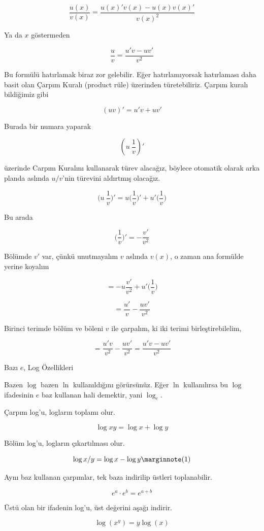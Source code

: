 \documentclass[12pt,fleqn]{article}\usepackage{../../common}
\begin{document}
$$ \frac{ u(x)}{v(x)} = \frac{u(x)'v(x) - u(x)v(x)'}{v(x)^2} $$

Ya da $x$ göstermeden

$$ \frac{ u}{v} = \frac{u'v - uv'}{v^2} $$

Bu formülü hatırlamak biraz zor gelebilir. Eğer hatırlamıyorsak hatırlaması
daha basit olan Çarpım Kuralı (product rüle) üzerinden
türetebiliriz. Çarpım kuralı bildiğimiz gibi

$$ (uv)' = u'v + uv' $$

Burada bir numara yaparak 

$$ (u \ \frac{ 1}{v})' $$

üzerinde Carpım Kuralını kullanarak türev alacağız, böylece otomatik olarak
arka planda aslında $u/v$'nin türevini aldırtmış olacağız. 

$$ \bigg(u \ \frac{ 1}{v}\bigg)' = 
u \bigg(\frac{1}{v}\bigg)' + u' \bigg(\frac{1}{v}\bigg)
$$

Bu arada

$$ \bigg(\frac{ 1}{v}\bigg)'  = -\frac{v'}{v^2} $$

Bölümde $v'$ var, çünkü unutmayalım $v$ aslında $v(x)$, o zaman ana
formülde yerine koyalım

$$  = 
-u\frac{v'}{v^2}  + u' \bigg(\frac{1}{v}\bigg)
$$

$$  = 
\frac{u' }{v} -\frac{uv'}{v^2}
$$


Birinci terimde bölüm ve böleni $v$ ile çarpalım, ki iki terimi
birleştirebilelim, 

$$  = 
\frac{u'v }{v^2} -\frac{uv'}{v^2} = 
\frac{u'v-uv'}{v^2}
$$

\newpage

Bazı $e$, Log Özellikleri

Bazen $\log$ bazen $\ln$ kullanıldığını görürsünüz. Eğer $\ln$
kullanılırsa bu $\log$ ifadesinin $e$ baz kullanan hali demektir, yani
$\log_e$. 

Çarpım log'u, logların toplamı olur.

$$ \log xy = \log x + \log y $$

Bölüm log'u, logların çıkartılması olur.

$$ \log x/y = \log x - \log y  
\mlabel{1}
$$

Aynı baz kullanan çarpımlar, tek baza indirilip üstleri toplanabilir.

$$ e^a \cdot e^b = e^{a+b} $$

Üstü olan bir ifadenin log'u, üst değerini aşağı indirir.

$$ \log(x^y) = y \log(x) $$
\end{document}
